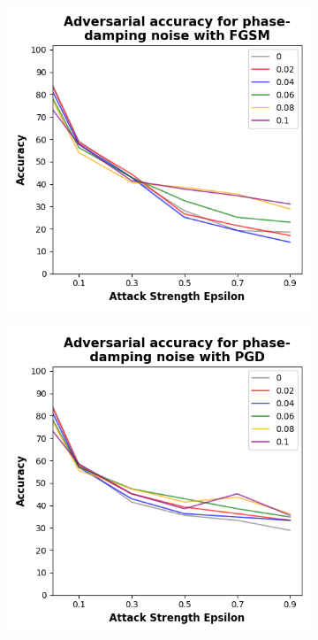 \begin{figure}[!h]
  \centering

  \begin{subfigure}{0.45\textwidth}
      \includegraphics[width=\linewidth]{figures/evaluation_results/breast-cancer/pqc/figures/phase-damping-fgsm.png}
      \label{fig:bc13}
  \end{subfigure} \qquad
  \begin{subfigure}{0.45\textwidth}
      \includegraphics[width=\linewidth]{figures/evaluation_results/breast-cancer/pqc/figures/phase-damping-pgd.png}

\end{subfigure}
\end{figure}
